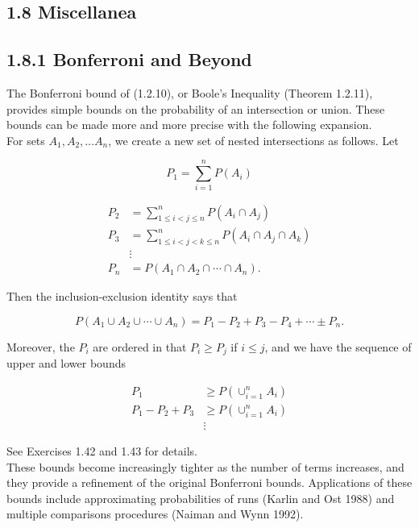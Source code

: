 \documentclass[10pt]{article}
\begin{document}
\subsection*{1.8 Miscellanea}
\subsection*{1.8.1 Bonferroni and Beyond}
The Bonferroni bound of (1.2.10), or Boole's Inequality (Theorem 1.2.11), provides simple bounds on the probability of an intersection or union. These bounds can be made more and more precise with the following expansion.\\
For sets $A_{1}, A_{2}, \ldots A_{n}$, we create a new set of nested intersections as follows. Let

$$
P_{1}=\sum_{i=1}^{n} P\left(A_{i}\right)
$$

$$
\begin{aligned}
P_{2} & =\sum_{1 \leq i<j \leq n}^{n} P\left(A_{i} \cap A_{j}\right) \\
P_{3} & =\sum_{1 \leq i<j<k \leq n}^{n} P\left(A_{i} \cap A_{j} \cap A_{k}\right) \\
& \vdots \\
P_{n} & =P\left(A_{1} \cap A_{2} \cap \cdots \cap A_{n}\right) .
\end{aligned}
$$

Then the inclusion-exclusion identity says that

$$
P\left(A_{1} \cup A_{2} \cup \cdots \cup A_{n}\right)=P_{1}-P_{2}+P_{3}-P_{4}+\cdots \pm P_{n} .
$$

Moreover, the $P_{i}$ are ordered in that $P_{i} \geq P_{j}$ if $i \leq j$, and we have the sequence of upper and lower bounds

$$
\begin{aligned}
P_{1} & \geq P\left(\cup_{i=1}^{n} A_{i}\right) \\
P_{1}-P_{2}+P_{3} & \geq P\left(\cup_{i=1}^{n} A_{i}\right) \\
& \vdots
\end{aligned}
$$

See Exercises 1.42 and 1.43 for details.\\
These bounds become increasingly tighter as the number of terms increases, and they provide a refinement of the original Bonferroni bounds. Applications of these bounds include approximating probabilities of runs (Karlin and Ost 1988) and multiple comparisons procedures (Naiman and Wynn 1992).
\end{document}
